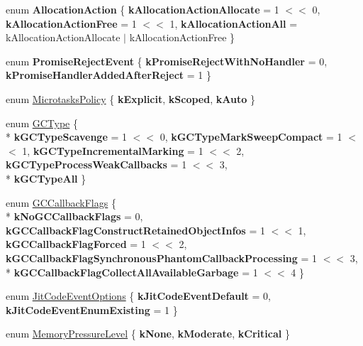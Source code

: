 \begin{DoxyCompactItemize}
\item 
enum {\bfseries Allocation\+Action} \{ {\bfseries k\+Allocation\+Action\+Allocate} = 1 $<$$<$ 0, 
{\bfseries k\+Allocation\+Action\+Free} = 1 $<$$<$ 1, 
{\bfseries k\+Allocation\+Action\+All} = k\+Allocation\+Action\+Allocate $\vert$ k\+Allocation\+Action\+Free
 \}\hypertarget{namespacev8_ae2b70dd2abba164d9ad9ffc9f757eca9}{}\label{namespacev8_ae2b70dd2abba164d9ad9ffc9f757eca9}

\item 
enum {\bfseries Promise\+Reject\+Event} \{ {\bfseries k\+Promise\+Reject\+With\+No\+Handler} = 0, 
{\bfseries k\+Promise\+Handler\+Added\+After\+Reject} = 1
 \}\hypertarget{namespacev8_a307b3674d4966684f8170a4fbd932eaf}{}\label{namespacev8_a307b3674d4966684f8170a4fbd932eaf}

\item 
enum \hyperlink{namespacev8_a2f183b102b3d1b7a30a805e8c53c04da}{Microtasks\+Policy} \{ {\bfseries k\+Explicit}, 
{\bfseries k\+Scoped}, 
{\bfseries k\+Auto}
 \}
\item 
enum \hyperlink{namespacev8_ac109d6f27e0c0f9ef4e98bcf7a806cf2}{G\+C\+Type} \{ \\*
{\bfseries k\+G\+C\+Type\+Scavenge} = 1 $<$$<$ 0, 
{\bfseries k\+G\+C\+Type\+Mark\+Sweep\+Compact} = 1 $<$$<$ 1, 
{\bfseries k\+G\+C\+Type\+Incremental\+Marking} = 1 $<$$<$ 2, 
{\bfseries k\+G\+C\+Type\+Process\+Weak\+Callbacks} = 1 $<$$<$ 3, 
\\*
{\bfseries k\+G\+C\+Type\+All}
 \}
\item 
enum \hyperlink{namespacev8_a247c37a849f4d6c293b9b16e94e1944b}{G\+C\+Callback\+Flags} \{ \\*
{\bfseries k\+No\+G\+C\+Callback\+Flags} = 0, 
{\bfseries k\+G\+C\+Callback\+Flag\+Construct\+Retained\+Object\+Infos} = 1 $<$$<$ 1, 
{\bfseries k\+G\+C\+Callback\+Flag\+Forced} = 1 $<$$<$ 2, 
{\bfseries k\+G\+C\+Callback\+Flag\+Synchronous\+Phantom\+Callback\+Processing} = 1 $<$$<$ 3, 
\\*
{\bfseries k\+G\+C\+Callback\+Flag\+Collect\+All\+Available\+Garbage} = 1 $<$$<$ 4
 \}
\item 
enum \hyperlink{namespacev8_a06f34fa4fa4cfc8518366808d1d461c1}{Jit\+Code\+Event\+Options} \{ {\bfseries k\+Jit\+Code\+Event\+Default} = 0, 
{\bfseries k\+Jit\+Code\+Event\+Enum\+Existing} = 1
 \}
\item 
enum \hyperlink{namespacev8_ae0e9a25bf51e518585f555806e7dc7b9}{Memory\+Pressure\+Level} \{ {\bfseries k\+None}, 
{\bfseries k\+Moderate}, 
{\bfseries k\+Critical}
 \}
\end{DoxyCompactItemize}
